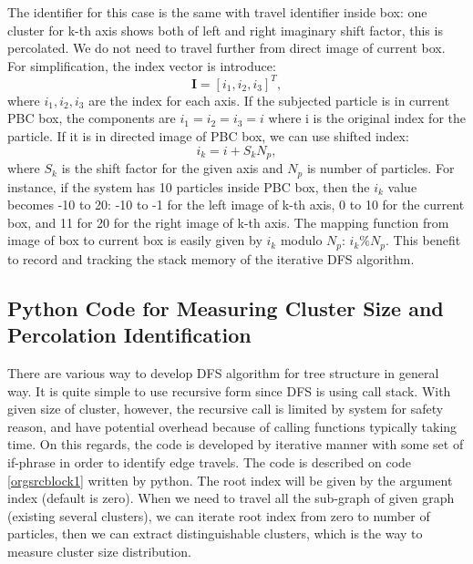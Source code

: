 \documentclass[10pt, a4paper]{article}
\begin{document}
\begin{appendices}
The identifier for this case is the same with travel identifier inside box: one cluster for k-th axis shows both of left and right imaginary shift factor, this is percolated. We do not need to travel further from direct image of current box. For simplification, the index vector is introduce:
\begin{equation}
\mathbf{I} = [i_1, i_2, i_3]^T,
\end{equation}
where \(i_1, i_2, i_3\) are the index for each axis. If the subjected particle is in current PBC box, the components are \(i_1 = i_2 = i_3 = i\) where i is the original index for the particle. If it is in directed image of PBC box, we can use shifted index:
\begin{equation}
i_k = i + S_k N_p,
\end{equation}
where \(S_k\) is the shift factor for the given axis and \(N_p\) is number of particles. For instance, if the system has 10 particles inside PBC box, then the \(i_k\) value becomes -10 to 20: -10 to -1 for the left image of k-th axis, 0 to 10 for the current box, and 11 for 20 for the right image of k-th axis. The mapping function from image of box to current box is easily given by \(i_k\) modulo \(N_p\): \(i_k\% N_p\). This benefit to record and tracking the stack memory of the iterative DFS algorithm.





\subsection{Python Code for Measuring Cluster Size and Percolation Identification}
\label{sec:orgheadline12}
There are various way to develop DFS algorithm for tree structure in general way. It is quite simple to use recursive form since DFS is using call stack. With given size of cluster, however, the recursive call is limited by system for safety reason, and have potential overhead because of calling functions typically taking time. On this regards, the code is developed by iterative manner with some set of if-phrase in order to identify edge travels. The code is described on code \ref{orgsrcblock1} written by python. The root index will be given by the argument index (default is zero). When we need to travel all the sub-graph of given graph (existing several clusters), we can iterate root index from zero to number of particles, then we can extract distinguishable clusters, which is the way to measure cluster size distribution.




\end{appendices}
\end{document}
